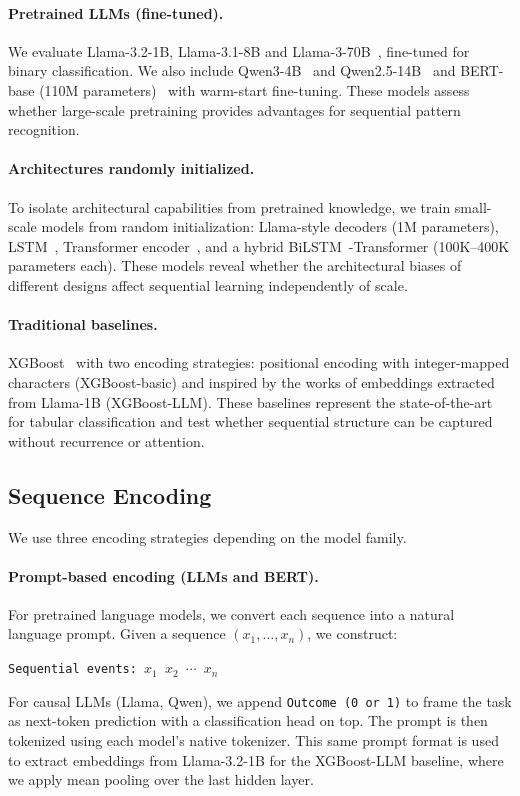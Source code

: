 \documentclass{article}
\theoremstyle{plain}
\theoremstyle{definition}
\theoremstyle{remark}
\begin{document}
\paragraph{Pretrained LLMs (fine-tuned).} 
We evaluate Llama-3.2-1B, Llama-3.1-8B and Llama-3-70B~\citep{touvron2023llama, grattafiori2024llama3}, fine-tuned for binary classification. We also include Qwen3-4B~\citep{bai2023qwen} and Qwen2.5-14B~\citep{qwen2.5, qwen2} and BERT-base (110M parameters)~\citep{devlin2019bert} with warm-start fine-tuning. These models assess whether large-scale pretraining provides advantages for sequential pattern recognition.

\paragraph{Architectures randomly initialized.}
To isolate architectural capabilities from pretrained knowledge, we train small-scale models from random initialization: Llama-style decoders (1M parameters), LSTM~\citep{hochreiter1997lstm}, Transformer encoder~\citep{vaswani2017attention}, and a hybrid BiLSTM~\citep{graves2005bilstm}-Transformer (100K--400K parameters each). These models reveal whether the architectural biases of different designs affect sequential learning independently of scale.

\paragraph{Traditional baselines.}
XGBoost~\citep{chen2016xgboost} with two encoding strategies: positional encoding with integer-mapped characters (XGBoost-basic) and inspired by the works of  \citet{XGBoost_LLMs, XGBoost_LLMs_HF} embeddings extracted from Llama-1B (XGBoost-LLM). These baselines represent the state-of-the-art for tabular classification and test whether sequential structure can be captured without recurrence or attention.


\subsection{Sequence Encoding}
\label{subsec:encoding}

We use three encoding strategies depending on the model family.

\paragraph{Prompt-based encoding (LLMs and BERT).}
For pretrained language models, we convert each sequence into a natural language prompt. Given a sequence $(x_1, \ldots, x_n)$, we construct:
\begin{center}
\texttt{Sequential events: $x_1$ $x_2$ $\cdots$ $x_n$}
\end{center}
For causal LLMs (Llama, Qwen), we append \texttt{Outcome (0 or 1)} to frame the task as next-token prediction with a classification head on top. The prompt is then tokenized using each model's native tokenizer. This same prompt format is used to extract embeddings from Llama-3.2-1B for the XGBoost-LLM baseline, where we apply mean pooling over the last hidden layer.
\end{document}
